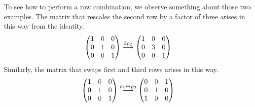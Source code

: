 To see how to perform a row combination, 
we observe something about those two examples.
The matrix that rescales the second row by a factor of three arises in this 
way from the identity.
\begin{equation*}
    \begin{pmatrix}
      1  &0  &0  \\
      0  &1  &0  \\
      0  &0  &1
    \end{pmatrix}
  \mathrel{ \mathop{\longrightarrow}\limits^{3\rho_2\mathstrut}_{ \begin{subarray}{l} \relax \end{subarray}}}
    \begin{pmatrix}
      1  &0  &0  \\
      0  &3  &0  \\
      0  &0  &1
    \end{pmatrix}
\end{equation*}
Similarly, the matrix that swaps first and third rows arises in this way.
\begin{equation*}
    \begin{pmatrix}
      1  &0  &0  \\
      0  &1  &0  \\
      0  &0  &1
    \end{pmatrix}
  \mathrel{ \mathop{\longrightarrow}\limits^{\rho_1\leftrightarrow\rho_3\mathstrut}_{ \begin{subarray}{l} \relax \end{subarray}}}
    \begin{pmatrix}
      0  &0  &1  \\
      0  &1  &0  \\
      1  &0  &0
    \end{pmatrix}
\end{equation*}

